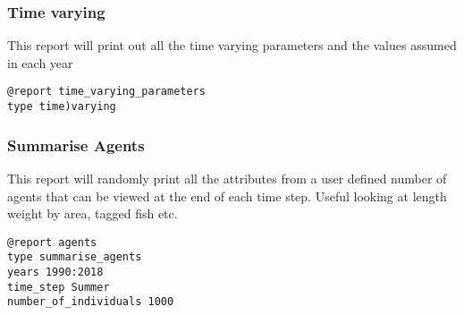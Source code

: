 \subsubsection{Time varying}
This report will print out all the time varying parameters and the values assumed in each year
{\small{\begin{verbatim}
@report time_varying_parameters
type time)varying
\end{verbatim}}}


\subsubsection{Summarise Agents}
This report will randomly print all the attributes from a user defined number of agents that can be viewed at the end of each time step. Useful looking at length weight by area, tagged fish etc.
{\small{\begin{verbatim}
@report agents
type summarise_agents
years 1990:2018
time_step Summer
number_of_individuals 1000
\end{verbatim}}}


